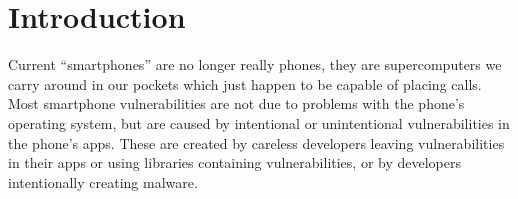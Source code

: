\documentclass[journal,transmag]{IEEEtran}
\newcommand{\todo}[1]{\textcolor{cyan}{\textbf{[#1]}}}
\newcommand{\dan}[1]{\textcolor{blue}{{\it [Dan says: #1]}}}
\begin{document}
\begin{abstract}











\end{abstract}

\section{Introduction}




Current ``smartphones'' are no longer really phones, they are supercomputers we carry around in our pockets which just happen to be capable of placing calls. Most smartphone vulnerabilities are not due to problems with the phone's operating system, but are caused by intentional or unintentional vulnerabilities in the phone's apps. These are created by careless developers leaving vulnerabilities in their apps or using libraries containing vulnerabilities, or by developers intentionally creating malware.%
\end{document}
